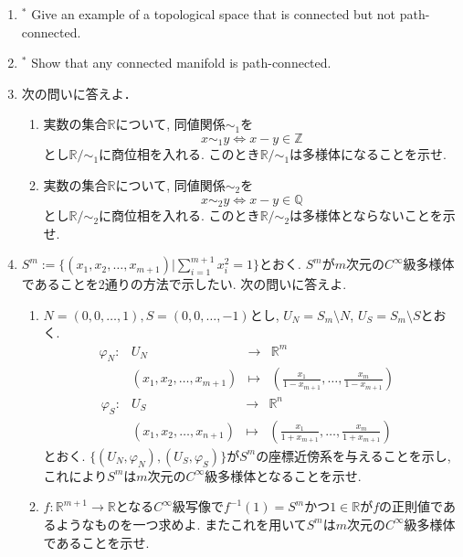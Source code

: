 \documentclass[dvipdfmx,a4paper,11pt]{article}
\newcommand{\R}{\mathbb{R}}
\newcommand{\Z}{\mathbb{Z}}
\newcommand{\Q}{\mathbb{Q}}
\theoremstyle{definition}
\begin{document}
\begin{enumerate}[label=\textbf{問}1.\arabic*]
	\item $^{*}$ Give an example of a topological space that is connected but not path-connected. %
	\item $^{*}$ Show that any connected manifold is path-connected. %
\item 次の問いに答えよ．
	\begin{enumerate}
	\item 実数の集合$\R$について, 同値関係$\sim_{1}$を
	$$
	x \sim_{1} y \Leftrightarrow x - y \in \Z
	$$
	とし$\R / \sim_{1}$に商位相を入れる. このとき$\R / \sim_{1}$は多様体になることを示せ.
	\item 実数の集合$\R$について, 同値関係$\sim_{2}$を
	$$
	x \sim_{2} y \Leftrightarrow x - y \in \Q
	$$
	とし$\R / \sim_{2}$に商位相を入れる.  このとき$\R / \sim_{2}$は多様体とならないことを示せ.
	\end{enumerate}
	
\item \label{sphere} $S^{m} := \{ (x_1, x_2, \ldots, x_{m+1})| \sum_{i=1}^{m+1} x_{i}^{2} = 1 \}$とおく. $S^{m}$が$m$次元の$C^{\infty}$級多様体であることを2通りの方法で示したい. 次の問いに答えよ. 
	\begin{enumerate}
	\item $N=(0,0,\ldots, 1),S=(0,0,\ldots, -1)$とし, $U_{N} = S_{m} \setminus N$, $U_{S} = S_{m} \setminus S$とおく. 
$$
\begin{array}{ccccc}
\varphi_{N}: &U_{N}& \rightarrow & \R^{m} & \\
&(x_{1},x_{2}, \ldots ,x_{m+1})& \longmapsto &(\frac{x_{1}}{1-x_{m+1}}, \ldots, \frac{x_{m}}{1-x_{m+1}})&
\end{array}
$$	
$$
\begin{array}{ccccc}
\varphi_{S}: &U_{S}& \rightarrow & \R^{n} & \\
&(x_{1}, x_{2}, \ldots, x_{n+1})& \longmapsto &(\frac{x_1}{1 + x_{m+1}}, \ldots, \frac{x_m}{1+x_{m+1}})&
\end{array}
$$	
とおく. $\{(U_N, \varphi_N), (U_S, \varphi_S) \}$が$S^m$の座標近傍系を与えることを示し, これにより$S^{m}$は$m$次元の$C^{\infty}$級多様体となることを示せ.
	\item $f : \R^{m+1} \rightarrow \R$となる$C^{\infty}$級写像で$f^{-1}(1) = S^{m}$かつ$1 \in \R$が$f$の正則値であるようなものを一つ求めよ. またこれを用いて$S^{m}$は$m$次元の$C^{\infty}$級多様体であることを示せ. 
	\end{enumerate}


\end{enumerate}
\end{document}
